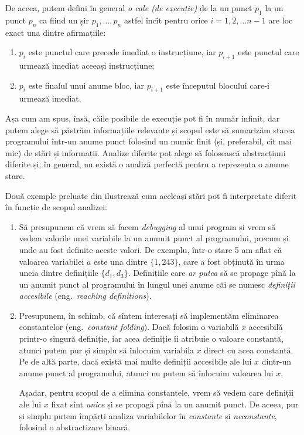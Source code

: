De aceea, putem defini în general \emph{o cale (de execuție)} de la un punct
$ p_1 $ la un punct $ p_n $ ca fiind un șir $ p_1, \dots, p_n $ astfel
încît pentru orice $ i = 1, 2, \dots n - 1 $ are loc exact una dintre
afirmațiile:
\begin{enumerate}[(1)]
\item $ p_i $ este punctul care precede imediat o instrucțiune, iar $ p_{i + 1} $
  este punctul care urmează imediat aceeași instrucțiune;
\item $ p_i $ este finalul unui anume bloc, iar $ p_{i+1} $ este începutul
  blocului care-i urmează imediat.
\end{enumerate}

Așa cum am spus, însă, căile posibile de execuție pot fi în număr infinit,
dar putem alege să păstrăm informațiile relevante și scopul este să
sumarizăm starea programului într-un anume punct folosind un număr finit
(și, preferabil, cît mai mic) de stări și informații. Analize diferite
pot alege să folosească abstracțiuni diferite și, în general, nu există
o analiză perfectă pentru a reprezenta o anume stare.

Două exemple preluate din \cite{aho} ilustrează cum aceleași stări
pot fi interpretate diferit în funcție de scopul analizei:
\begin{enumerate}[(1)]
\item Să presupunem că vrem să facem \emph{debugging} al unui program
  și vrem să vedem valorile unei variabile la un anumit punct al programului,
  precum și unde au fost definite aceste valori. De exemplu, într-o stare 5
  am aflat că valoarea variabilei $ a $ este una dintre $ \{ 1, 243 \} $, care
  a fost obținută în urma uneia dintre definițiile $ \{ d_1, d_3 \} $.
  Definițiile care \emph{ar putea} să se propage pînă la un anumit punct al
  programului în lungul unei anume căi se numesc \emph{definiții accesibile}
  (eng.\ \emph{reaching definitions}).
\item Presupunem, în schimb, că sîntem interesați să implementăm eliminarea
  constantelor (eng.\ \emph{constant folding}). Dacă folosim o variabilă
  $ x $ accesibilă printr-o singură definiție, iar acea definiție îi atribuie
  o valoare constantă, atunci putem pur și simplu să înlocuim variabila
  $ x $ direct cu acea constantă. Pe de altă parte, dacă există mai multe
  definiții accesibile ale lui $ x $ dintr-un anume punct al programului,
  atunci nu putem să înlocuim valoarea lui $ x $.

  Așadar, pentru scopul de a elimina constantele, vrem să vedem care
  definiții ale lui $ x $ fixat sînt \emph{unice} și se propagă pînă la
  un anumit punct. De aceea, pur și simplu putem împărți analiza variabilelor
  în \emph{constante} și \emph{neconstante}, folosind o abstractizare
  binară.
\end{enumerate}

